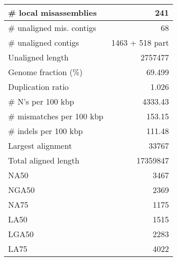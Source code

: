 \documentclass[12pt,a4paper]{article}
\begin{document}
\begin{table}[ht]
\begin{center}
\begin{tabular}{|l*{1}{|r}|}
\# local misassemblies & 241 \\ \hline
\# unaligned mis. contigs & 68 \\ \hline
\# unaligned contigs & 1463 + 518 part \\ \hline
Unaligned length & 2757477 \\ \hline
Genome fraction (\%) & 69.499 \\ \hline
Duplication ratio & 1.026 \\ \hline
\# N's per 100 kbp & 4333.43 \\ \hline
\# mismatches per 100 kbp & 153.15 \\ \hline
\# indels per 100 kbp & 111.48 \\ \hline
Largest alignment & 33767 \\ \hline
Total aligned length & 17359847 \\ \hline
NA50 & 3467 \\ \hline
NGA50 & 2369 \\ \hline
NA75 & 1175 \\ \hline
LA50 & 1515 \\ \hline
LGA50 & 2283 \\ \hline
LA75 & 4022 \\ \hline
\end{tabular}
\end{center}
\end{table}
\end{document}
